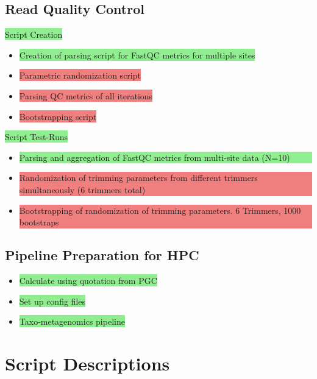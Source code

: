 \documentclass[11pt]{report}
\newcommand{\done}{\checkmark}
\newcommand{\highlightessential}[1]{\colorbox{lightgreen}{#1}}
\newcommand{\highlightrobust}[1]{\colorbox{lightcoral}{#1}}
\begin{document}
\begin{multicols}{2}
\subsection*{Read Quality Control}
\highlightessential{Script Creation}
\begin{itemize}
	\item [\done] \highlightessential{Creation of parsing script for FastQC metrics for multiple sites}
	\item [\done] \highlightrobust{Parametric randomization script}
	\item [\done] \highlightrobust{Parsing QC metrics of all iterations}
	\item [\done] \highlightrobust{Bootstrapping script}
\end{itemize}

\highlightessential{Script Test-Runs}
\begin{itemize}
	\item [\done] \highlightessential{\parbox[t]{\linewidth}{Parsing and aggregation of FastQC metrics from multi-site data (N=10)}}
	\item [\done] \highlightrobust{\parbox[t]{\linewidth}{Randomization of trimming parameters from different trimmers simultaneously (6 trimmers total)}}
	\item [\done] \highlightrobust{\parbox[t]{\linewidth}{Bootstrapping of randomization of trimming parameters. 6 Trimmers, 1000 bootstraps}}
\end{itemize}


\subsection*{Pipeline Preparation for HPC}
\begin{itemize}
	\item [\done] \highlightessential{Calculate using quotation from PGC}
	\item [\done] \highlightessential{Set up config files}
	\item [\done] \highlightessential{Taxo-metagenomics pipeline}
\end{itemize}

	\end{multicols}


\onecolumn
\newpage
\setcounter{section}{1}  %



\newpage
\onecolumn

\section*{\centering \huge \textbf{Script Descriptions}}  %
\end{document}
